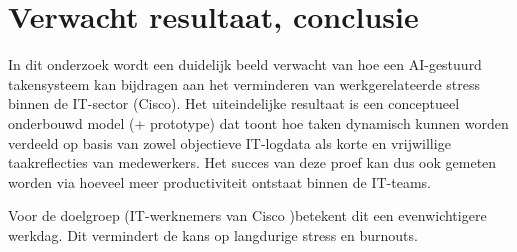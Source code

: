 \section{Verwacht resultaat, conclusie}%
\label{sec:verwachte_resultaten}

In dit onderzoek wordt een duidelijk beeld verwacht van hoe een AI-gestuurd takensysteem kan bijdragen aan het verminderen van werkgerelateerde stress binnen de IT-sector (Cisco). Het uiteindelijke resultaat is een conceptueel onderbouwd model (+ prototype) dat toont hoe taken dynamisch kunnen worden verdeeld op basis van zowel objectieve IT-logdata als korte en vrijwillige taakreflecties van medewerkers. Het succes van deze proef kan dus ook gemeten worden via hoeveel meer productiviteit ontstaat binnen de IT-teams.

Voor de doelgroep (IT-werknemers van Cisco )betekent dit een evenwichtigere werkdag. Dit vermindert de kans op langdurige stress en burnouts.




